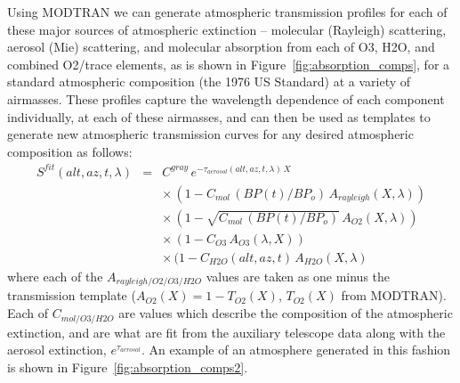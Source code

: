 \documentclass[12pt,preprint]{aastex}
\begin{document}
Using MODTRAN we can generate atmospheric transmission profiles for
each of these major sources of atmospheric extinction -- molecular
(Rayleigh) scattering, aerosol (Mie) scattering, and molecular
absorption from each of O3, H2O, and combined O2/trace elements, as is
shown in Figure~\ref{fig:absorption_comps}, for a standard atmospheric
composition (the 1976 US Standard) at a variety of airmasses. These
profiles capture the wavelength dependence of each component
individually, at each of these airmasses, and can then be used as
templates to generate new atmospheric transmission curves for any
desired atmospheric composition as follows:
\begin{eqnarray}
S^{fit}(alt,az,t, \lambda) & = & C^{gray} \,e^{-\tau_{aerosol}(alt,az,t,\lambda)\,X} \nonumber \\
 & & \times \, (1 - C_{mol}\, (BP(t) / BP_o) \, A_{rayleigh}(X, \lambda)) \nonumber \\
 & & \times \, (1 - \sqrt{ C_{mol}\, (BP(t) / BP_o)} \, A_{O2}(X, \lambda)) \nonumber \\
 & & \times \, (1 - C_{O3} \, A_{O3}(\lambda, X)) \nonumber \\
 & & \times \, (1 - C_{H2O}(alt,az,t)\,A_{H2O}(X, \lambda)
\label{eqn:atmo_fit}
\end{eqnarray}
where each of the $A_{rayleigh/O2/O3/H2O}$ values are taken as one
minus the transmission template ($A_{O2}(X) = 1 - T_{O2}(X)$,
$T_{O2}(X)$ from MODTRAN). Each of $C_{mol/O3/H2O}$ are values which 
describe the composition of the atmospheric extinction, and are what are
fit from the auxiliary telescope data along with the aerosol extinction, 
$e^{\tau_{aerosol}}$. An example of an atmosphere generated in this fashion
is shown in Figure~\ref{fig:absorption_comps2}. 
\end{document}
